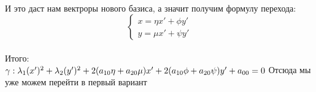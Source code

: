 \documentclass{book}
\begin{document}
\\
И это даст нам вектроры нового базиса, а значит получим формулу перехода:\\
\begin{equation}
    \begin{cases}
        x=\eta x'+\phi y'\\
        y=\mu x'+\psi y'
    \end{cases}
\end{equation}\\
Итого:\\
$\gamma: \lambda_1(x')^2+\lambda_2(y')^2+2(a_{10}\eta+a_{20}\mu)x'+2(a_{10}\phi+a_{20}\psi)y'+a_{00}=0\\$
Отсюда мы уже можем перейти в первый вариант\\
\end{document}

